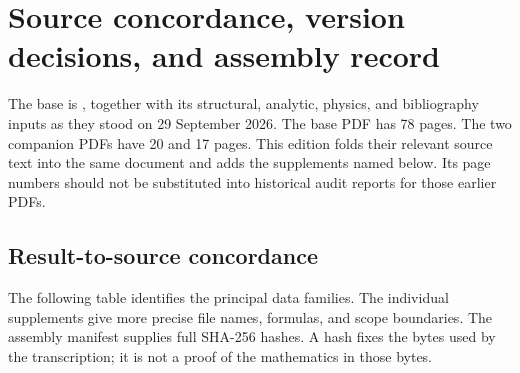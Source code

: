 \section{Source concordance, version decisions, and assembly record}
\label{exp:assembly}

The base is , together with its structural,
analytic, physics, and bibliography inputs as they stood on 29 September
2026. The base PDF has 78 pages. The two companion PDFs have 20 and 17
pages. This edition folds their relevant source text into the same
document and adds the supplements named below. Its page numbers should
not be substituted into historical audit reports for those earlier PDFs.

\subsection{Result-to-source concordance}
The following table identifies the principal data families. The individual
supplements give more precise file names, formulas, and scope boundaries.
The assembly manifest supplies full SHA-256 hashes. A hash fixes the bytes
used by the transcription; it is not a proof of the mathematics in those
bytes.

